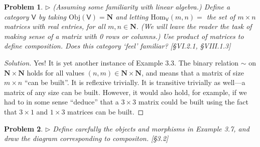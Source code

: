 \documentclass[fontsize=14pt]{scrartcl}
\newtheorem{problem-internal}{Problem}[subsection]
\newenvironment{problem}{
  \medskip
  \begin{problem-internal}
}{
  \end{problem-internal}
}
\newenvironment{solution}{
  \begin{proof}[Solution]
  \vspace{-8px}
  \setlength{\parskip}{4px}
  \setlength{\parindent}{0px}
}{
  \end{proof}
}
\newcommand{\Obj}{\mathrm{Obj}}
\newcommand{\Hom}{\mathrm{Hom}}
\begin{document}
\begin{problem}
$\rhd$ (Assuming some familiarity with linear algebra.) Define a category
$\mathsf{V}$ by taking $\Obj(\mathsf{V}) = \mathbf{N}$ and letting
$\Hom_{\mathsf{V}}(m,n) = $ the set of $m\times n$ matrices with real
entries, for all $m,n\in\mathbf{N}$. (We will leave the reader the task of
making sense of a matrix with 0 rows or columns.) Use product of matrices to
define composition. Does this category `feel' familiar? [\S VI.2.1, \S VIII.1.3]
\end{problem}

\begin{solution}
Yes! It is yet another instance of Example 3.3. The binary relation $\sim$ on
$\mathbf{N} \times \mathbf{N}$ holds for all values $(n,m)\in\mathbf{N} \times
\mathbf{N}$, and means that a matrix of size $m\times n$ ``can be built''. It is
reflexive trivially. It is transitive trivially as well---a matrix of any size
can be built. However, it would also hold, for example, if we had to in some
sense ``deduce'' that a $3\times 3$ matrix could be built using the fact that
$3\times 1$ and $1\times 3$ matrices can be built.
\end{solution}


\begin{problem}
$\rhd$ Define carefully the objects and morphisms in Example 3.7, and draw the
diagram corresponding to compositon. [\S 3.2]
\end{problem}
\end{document}
